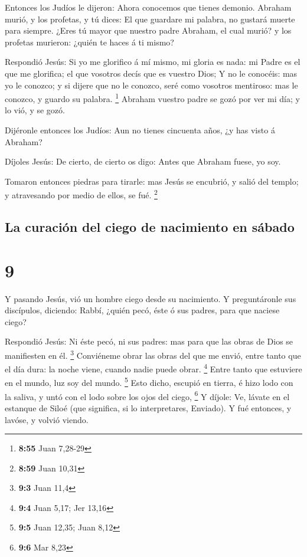  Entonces los Judíos le dijeron: Ahora conocemos que
tienes demonio. Abraham murió, y los profetas, y tú dices: El que
guardare mi palabra, no gustará muerte para siempre. 
¿Eres tú mayor que nuestro padre Abraham, el cual murió? y los profetas
murieron: ¿quién te haces á ti mismo?

 Respondió Jesús: Si yo me glorifico á mí mismo, mi
gloria es nada: mi Padre es el que me glorifica; el que vosotros decís
que es vuestro Dios;  Y no le conocéis: mas yo le
conozco; y si dijere que no le conozco, seré como vosotros mentiroso:
mas le conozco, y guardo su palabra. \footnote{\textbf{8:55} Juan
  7,28-29}  Abraham vuestro padre se gozó por ver mi día;
y lo vió, y se gozó.

 Dijéronle entonces los Judíos: Aun no tienes cincuenta
años, ¿y has visto á Abraham?

 Díjoles Jesús: De cierto, de cierto os digo: Antes que
Abraham fuese, yo soy.

 Tomaron entonces piedras para tirarle: mas Jesús se
encubrió, y salió del templo; y atravesando por medio de ellos, se fué.
\footnote{\textbf{8:59} Juan 10,31}

\hypertarget{la-curaciuxf3n-del-ciego-de-nacimiento-en-suxe1bado}{%
\subsection{La curación del ciego de nacimiento en
sábado}\label{la-curaciuxf3n-del-ciego-de-nacimiento-en-suxe1bado}}

\hypertarget{section-8}{%
\section{9}\label{section-8}}

 Y pasando Jesús, vió un hombre ciego desde su nacimiento.
 Y preguntáronle sus discípulos, diciendo: Rabbí, ¿quién
pecó, éste ó sus padres, para que naciese ciego?

 Respondió Jesús: Ni éste pecó, ni sus padres: mas para
que las obras de Dios se manifiesten en él. \footnote{\textbf{9:3} Juan
  11,4}  Conviéneme obrar las obras del que me envió,
entre tanto que el día dura: la noche viene, cuando nadie puede obrar.
\footnote{\textbf{9:4} Juan 5,17; Jer 13,16}  Entre tanto
que estuviere en el mundo, luz soy del mundo. \footnote{\textbf{9:5}
  Juan 12,35; Juan 8,12}  Esto dicho, escupió en tierra, é
hizo lodo con la saliva, y untó con el lodo sobre los ojos del ciego,
\footnote{\textbf{9:6} Mar 8,23}  Y díjole: Ve, lávate en
el estanque de Siloé (que significa, si lo interpretares, Enviado). Y
fué entonces, y lavóse, y volvió viendo.

